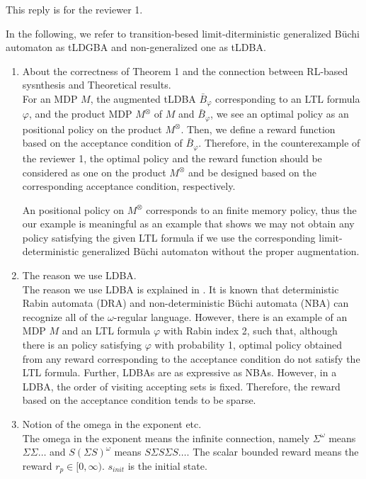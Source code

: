 \documentclass[10 pt, dvipdfmx]{article}
\theoremstyle{definition}
\begin{document}
This reply is for the reviewer 1.

In the following, we refer to transition-besed limit-diterministic generalized B\"{u}chi automaton as tLDGBA and non-generalized one as tLDBA.

\begin{enumerate}
  \item About the correctness of Theorem 1 and the connection between RL-based sysnthesis and Theoretical results. \\
  For an MDP $M$, the augmented tLDBA $\bar{B}_{\varphi}$ corresponding to an LTL formula $\varphi$, and the product MDP $M^{\otimes}$ of $M$ and $\bar{B}_{\varphi}$, we see an optimal policy as an positional policy on the product $M^{\otimes}$. Then, we define a reward function based on the acceptance condition of $\bar{B}_{\varphi}$. Therefore, in the counterexample of the reviewer 1, the optimal policy and the reward function should be considered as one on the product $M^{\otimes}$ and be designed based on the corresponding acceptance condition, respectively.

  An positional policy on $M^{\otimes}$ corresponds to an finite memory policy, thus the our example is meaningful as an example that shows we may not obtain any policy satisfying the given LTL formula if we use the corresponding limit-deterministic generalized B\"{u}chi automaton without the proper augmentation.

  \item The reason we use LDBA. \\
  The reason we use LDBA is explained in \cite{Hahn2019}. It is known that deterministic Rabin automata (DRA) and non-deterministic B\"{u}chi automata (NBA) can recognize all of the $\omega$-regular language. However, there is an example of an MDP $M$ and an LTL formula $\varphi$ with Rabin index 2, such that, although there is an policy satisfying $\varphi$ with probability 1, optimal policy obtained from any reward corresponding to the acceptance condition do not satisfy the LTL formula. Further, LDBAs are as expressive as NBAs.
  However, in a LDBA, the order of visiting accepting sets is fixed. Therefore, the reward based on the acceptance condition tends to be sparse.

  \item Notion of the omega in the exponent etc. \\
  The omega in the exponent means the infinite connection, namely $\Sigma^{\omega}$ means $\Sigma \Sigma \ldots$ and $S (\Sigma S)^{\omega}$ means $S \Sigma S \Sigma S \ldots$. The scalar bounded reward means the reward $r_p \in [0,\infty)$. $s_{init}$ is the initial state.


\end{enumerate}
\end{document}
